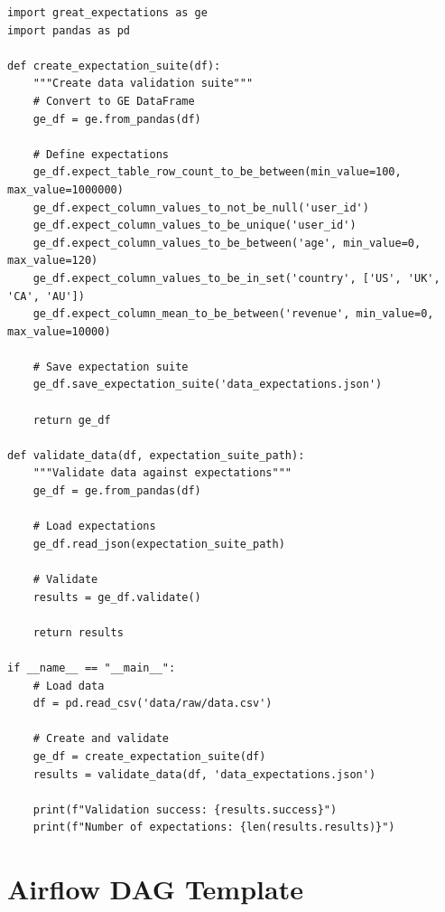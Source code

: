 \begin{lstlisting}[style=python, caption=validate\_data.py]
import great_expectations as ge
import pandas as pd

def create_expectation_suite(df):
    """Create data validation suite"""
    # Convert to GE DataFrame
    ge_df = ge.from_pandas(df)

    # Define expectations
    ge_df.expect_table_row_count_to_be_between(min_value=100, max_value=1000000)
    ge_df.expect_column_values_to_not_be_null('user_id')
    ge_df.expect_column_values_to_be_unique('user_id')
    ge_df.expect_column_values_to_be_between('age', min_value=0, max_value=120)
    ge_df.expect_column_values_to_be_in_set('country', ['US', 'UK', 'CA', 'AU'])
    ge_df.expect_column_mean_to_be_between('revenue', min_value=0, max_value=10000)

    # Save expectation suite
    ge_df.save_expectation_suite('data_expectations.json')

    return ge_df

def validate_data(df, expectation_suite_path):
    """Validate data against expectations"""
    ge_df = ge.from_pandas(df)

    # Load expectations
    ge_df.read_json(expectation_suite_path)

    # Validate
    results = ge_df.validate()

    return results

if __name__ == "__main__":
    # Load data
    df = pd.read_csv('data/raw/data.csv')

    # Create and validate
    ge_df = create_expectation_suite(df)
    results = validate_data(df, 'data_expectations.json')

    print(f"Validation success: {results.success}")
    print(f"Number of expectations: {len(results.results)}")
\end{lstlisting}

\section{Airflow DAG Template}

